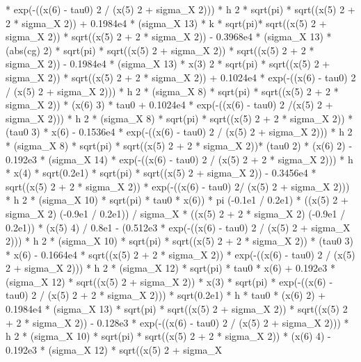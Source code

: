 \begin{maplegroup}
* exp(-((x(6) - tau0)  2 / (x(5)  2 + sigma\_X  2))) * h  2 * sqrt(pi) * sqrt((x(5)  2 + 2 * sigma\_X  2)) + 0.1984e4 * (sigma\_X  13) * k * sqrt(pi)* sqrt((x(5)  2 + sigma\_X  2)) * sqrt((x(5)  2 + 2 * sigma\_X  2)) - 0.3968e4 * (sigma\_X  13) * (abs(cg)  2) * sqrt(pi) * sqrt((x(5)  2 + sigma\_X  2)) * sqrt((x(5)  2 + 2 * sigma\_X  2)) - 0.1984e4 * (sigma\_X  13) * x(3)  2 * sqrt(pi) * sqrt((x(5)  2 + sigma\_X  2)) * sqrt((x(5)  2 + 2 * sigma\_X  2)) + 0.1024e4 * exp(-((x(6) - tau0)  2 / (x(5)  2 + sigma\_X  2))) * h  2 * (sigma\_X  8) * sqrt(pi) * sqrt((x(5)  2 + 2 * sigma\_X  2)) * (x(6)  3) * tau0 + 0.1024e4 * exp(-((x(6) - tau0)  2 /(x(5)  2 + sigma\_X  2))) * h  2 * (sigma\_X  8) * sqrt(pi) * sqrt((x(5)  2 + 2 * sigma\_X  2)) * (tau0  3) * x(6) - 0.1536e4 * exp(-((x(6) - tau0)  2 / (x(5)  2 + sigma\_X  2))) * h  2 * (sigma\_X  8) * sqrt(pi) * sqrt((x(5)  2 + 2 * sigma\_X  2))* (tau0  2) * (x(6)  2) - 0.192e3 * (sigma\_X  14) * exp(-((x(6) - tau0)  2 / (x(5)  2 + 2 * sigma\_X  2))) * h * x(4) * sqrt(0.2e1) * sqrt(pi) * sqrt((x(5)  2 + sigma\_X  2)) - 0.3456e4 * sqrt((x(5)  2 + 2 * sigma\_X  2)) * exp(-((x(6) - tau0)  2/ (x(5)  2 + sigma\_X  2))) * h  2 * (sigma\_X  10) * sqrt(pi) * tau0 * x(6)) * pi  (-0.1e1 / 0.2e1) * ((x(5)  2 + sigma\_X  2)  (-0.9e1 / 0.2e1)) / sigma\_X * ((x(5)  2 + 2 * sigma\_X  2)  (-0.9e1 / 0.2e1)) * (x(5)  4) / 0.8e1 - (0.512e3 * exp(-((x(6) - tau0)  2 / (x(5)  2 + sigma\_X  2))) * h  2 * (sigma\_X  10) * sqrt(pi) * sqrt((x(5)  2 + 2 * sigma\_X  2)) * (tau0  3) * x(6) - 0.1664e4 * sqrt((x(5)  2 + 2 * sigma\_X  2)) * exp(-((x(6) - tau0)  2 / (x(5)  2 + sigma\_X  2))) * h  2 * (sigma\_X  12) * sqrt(pi) * tau0 * x(6) + 0.192e3 * (sigma\_X  12) * sqrt((x(5)  2 + sigma\_X  2)) * x(3) * sqrt(pi) * exp(-((x(6) - tau0)  2 / (x(5)  2 + 2 * sigma\_X  2))) * sqrt(0.2e1) * h * tau0 * (x(6)  2) + 0.1984e4 * (sigma\_X  13) * sqrt(pi) * sqrt((x(5)  2 + sigma\_X  2)) * sqrt((x(5)  2 + 2 * sigma\_X  2)) - 0.128e3 * exp(-((x(6) - tau0)  2 / (x(5)  2 + sigma\_X  2))) * h  2 * (sigma\_X  10) * sqrt(pi) * sqrt((x(5)  2 + 2 * sigma\_X  2)) * (x(6)  4) - 0.192e3 * (sigma\_X  12) * sqrt((x(5) 2 + sigma\_X 
\end{maplegroup}
